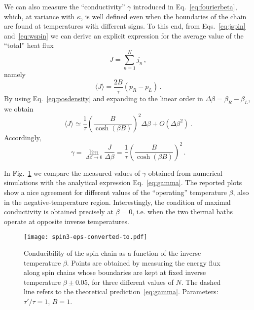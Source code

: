 \documentclass[iop, twocolumns, amssymb,notitlepage]{revtex4-1}
\newcommand{\indice}{n}
\newcommand{\hh}{B}
\begin{document}
We can also measure the ``conductivity'' $\gamma$ introduced in Eq.~\eqref{eq:fourierbeta},
which, at variance with $\kappa$, is well defined even when the boundaries of the chain are found at
temperatures with different signs.  To this end, from Eqs.~\eqref{eq:jspin} and~\eqref{eq:wspin} 
we can derive an explicit expression for the average value of the ``total'' heat flux 
%
\begin{equation}
 J = \sum_{\indice=1}^N j_{\indice}\,,
\end{equation} 
%
namely
 \begin{equation}
 \langle J \rangle = \frac{2\hh}{\tau}(p_R-p_L)\,.
\end{equation}
%
By using Eq.~\eqref{eq:posdensity}  and expanding to the linear order in $\Delta \beta=\beta_R-\beta_L$, we obtain
%
\begin{equation}
 \langle J \rangle \simeq \frac{1}{\tau}\left(\frac{\hh}{\cosh(\beta \hh)}\right)^2 \Delta \beta +O(\Delta\beta^2)\,.
\end{equation}
%
Accordingly,
\begin{equation}
\label{eq:gamma}
\gamma = \lim_{\Delta\beta\rightarrow 0}\frac{J}{\Delta\beta}=\frac{1}{\tau}\left( \frac{\hh}{\cosh(\beta \hh)}\right)^2\,.
\end{equation} 
  
In Fig.~\ref{fig:spin3} we compare the measured values of $\gamma$ obtained from numerical simulations with the analytical expression Eq.~\eqref{eq:gamma}.
The reported plots show  a nice agreement for different values of the ``operating'' temperature
$\beta$, also in the negative-temperature region. 
Interestingly, the condition of maximal conductivity is obtained precisely at $\beta=0$, i.e. when the two thermal baths
operate at opposite inverse temperatures.

 



 
 
 
 \begin{figure}
 \centering
\texttt{[image: spin3-eps-converted-to.pdf]}
\caption{\label{fig:spin3} Conducibility of the spin chain as a function of the inverse temperature $\beta$.
Points are obtained by measuring the energy flux along spin chains whose boundaries are kept at fixed inverse temperature $\beta \pm 0.05$, for three different values of $N$. The dashed line refers to the theoretical prediction~\eqref{eq:gamma}.
Parameters: $\tau'/\tau=1$, $\hh=1$.}
 \end{figure}
 
\end{document}
